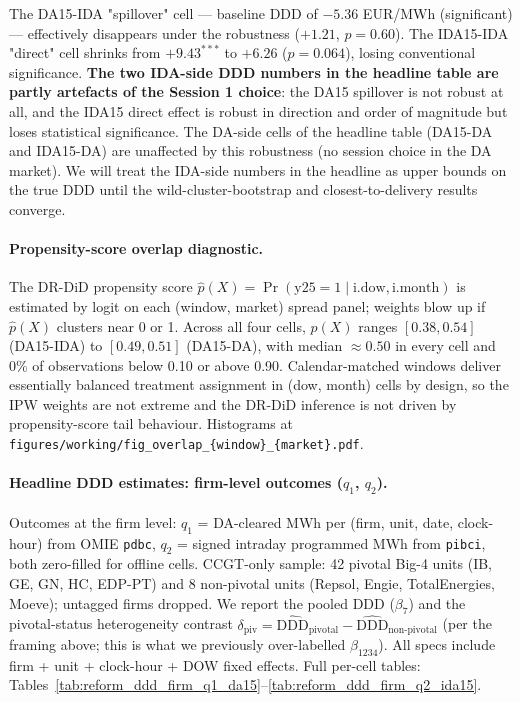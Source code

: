 \documentclass[11pt,a4paper]{article}
\newcommand{\code}[1]{\nolinkurl{#1}}
\begin{document}
The DA15-IDA "spillover" cell --- baseline DDD of $-5.36$ EUR/MWh (significant) --- effectively disappears under the robustness ($+1.21$, $p=0.60$). The IDA15-IDA "direct" cell shrinks from $+9.43^{***}$ to $+6.26$ ($p=0.064$), losing conventional significance. \textbf{The two IDA-side DDD numbers in the headline table are partly artefacts of the Session 1 choice}: the DA15 spillover is not robust at all, and the IDA15 direct effect is robust in direction and order of magnitude but loses statistical significance. The DA-side cells of the headline table (DA15-DA and IDA15-DA) are unaffected by this robustness (no session choice in the DA market). We will treat the IDA-side numbers in the headline as upper bounds on the true DDD until the wild-cluster-bootstrap and closest-to-delivery results converge.

\paragraph{Propensity-score overlap diagnostic.}
The DR-DiD propensity score $\hat p(X) = \Pr(\text{y25} = 1 \mid \text{i.dow}, \text{i.month})$ is estimated by logit on each (window, market) spread panel; weights blow up if $\hat p(X)$ clusters near 0 or 1. Across all four cells, $\hat p(X)$ ranges $[0.38, 0.54]$ (DA15-IDA) to $[0.49, 0.51]$ (DA15-DA), with median $\approx 0.50$ in every cell and 0\% of observations below 0.10 or above 0.90. Calendar-matched windows deliver essentially balanced treatment assignment in (dow, month) cells by design, so the IPW weights are not extreme and the DR-DiD inference is not driven by propensity-score tail behaviour. Histograms at \code{figures/working/fig_overlap_{window}_{market}.pdf}.

\paragraph{Headline DDD estimates: firm-level outcomes ($q_1$, $q_2$).}
Outcomes at the firm level: $q_1$ = DA-cleared MWh per (firm, unit, date, clock-hour) from OMIE \code{pdbc}, $q_2$ = signed intraday programmed MWh from \code{pibci}, both zero-filled for offline cells. CCGT-only sample: 42 pivotal Big-4 units (IB, GE, GN, HC, EDP-PT) and 8 non-pivotal units (Repsol, Engie, TotalEnergies, Moeve); untagged firms dropped. We report the pooled DDD ($\beta_7$) and the pivotal-status heterogeneity contrast $\delta_{\text{piv}} = \widehat{\text{DDD}}_{\text{pivotal}} - \widehat{\text{DDD}}_{\text{non-pivotal}}$ (per the framing above; this is what we previously over-labelled $\beta_{1234}$). All specs include firm + unit + clock-hour + DOW fixed effects. Full per-cell tables: Tables~\ref{tab:reform_ddd_firm_q1_da15}--\ref{tab:reform_ddd_firm_q2_ida15}.
\end{document}
